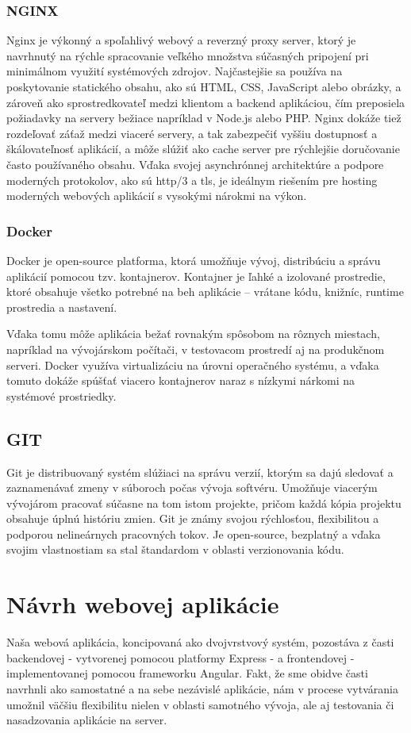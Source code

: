 \subsubsection{NGINX}
Nginx\cite{nginx} je výkonný a spoľahlivý webový a reverzný proxy server, ktorý je navrhnutý na rýchle spracovanie veľkého množstva súčasných pripojení pri minimálnom využití systémových zdrojov. 
Najčastejšie sa používa na poskytovanie statického obsahu, ako sú HTML, CSS, JavaScript alebo obrázky, a zároveň ako sprostredkovateľ medzi klientom a backend aplikáciou, čím preposiela požiadavky na servery bežiace napríklad v Node.js alebo PHP. 
Nginx dokáže tiež rozdeľovať záťaž medzi viaceré servery, a tak zabezpečiť vyššiu dostupnosť a škálovateľnosť aplikácií, a môže slúžiť ako cache server pre rýchlejšie doručovanie často používaného obsahu.
 Vďaka svojej asynchrónnej architektúre a podpore moderných protokolov, ako sú \acrshort{http}/3 a \acrshort{tls}, je ideálnym riešením pre hosting moderných webových aplikácií s vysokými nárokmi na výkon.
\subsubsection{Docker}
Docker je open-source platforma, ktorá umožňuje vývoj, distribúciu a správu aplikácií pomocou tzv. kontajnerov. 
Kontajner je ľahké a izolované prostredie, ktoré obsahuje všetko potrebné na beh aplikácie – vrátane kódu, knižníc, runtime prostredia a nastavení.

Vďaka tomu môže aplikácia bežať rovnakým spôsobom na rôznych miestach, napríklad na vývojárskom počítači, v testovacom prostredí aj na produkčnom serveri. 
Docker využíva virtualizáciu na úrovni operačného systému, a vďaka tomuto dokáže spúšťať viacero kontajnerov naraz s nízkymi nárkomi na systémové prostriedky.\cite{docker}
\subsection{GIT}
Git je distribuovaný systém slúžiaci na správu verzií, ktorým sa dajú sledovať a zaznamenávať zmeny v súboroch počas vývoja softvéru.
 Umožňuje viacerým vývojárom pracovať súčasne na tom istom projekte, pričom každá kópia projektu obsahuje úplnú históriu zmien. 
 Git je známy svojou rýchlosťou, flexibilitou a podporou nelineárnych pracovných tokov. 
Je open-source, bezplatný a vďaka svojim vlastnostiam sa stal štandardom v oblasti verzionovania kódu.\cite{git}

\section{Návrh webovej aplikácie}
Naša webová aplikácia, koncipovaná ako dvojvrstvový systém, pozostáva z časti  backendovej - vytvorenej pomocou platformy Express - a frontendovej - implementovanej pomocou frameworku Angular.
Fakt, že sme obidve časti navrhnli ako samostatné a na sebe nezávislé aplikácie, nám v procese vytvárania umožnil väčšiu flexibilitu nielen v oblasti samotného vývoja, ale aj testovania či nasadzovania aplikácie na server.

